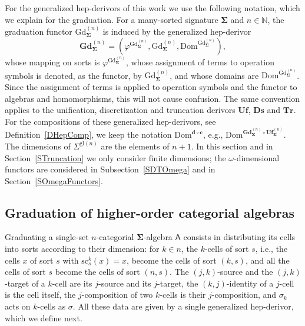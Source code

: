 \documentclass[a4paper, reqno
]{amsart}
\newcommand{\sig}[1]{\mathbf{#1}}             %
\newcommand{\calg}[1]{\boldsymbol{\mathsf{#1}}} %
\newcommand{\Dom}{\mathrm{Dom}}
\newcommand{\gl}{\mathrm{gl}}                %
\newcommand{\src}{\mathrm{sc}}
\newcommand{\Gd}{\mathrm{Gd}}
\newcommand{\bGd}{\mathbf{Gd}}
\newcommand{\bUf}{\mathbf{Uf}}
\newcommand{\bDs}{\mathbf{Ds}}
\newcommand{\bTr}{\mathbf{Tr}}
\theoremstyle{plain}
\theoremstyle{definition}
\begin{document}
For the generalized hep-derivors of this work we use the following notation, which we explain for the graduation.
For a many-sorted signature $\sig{\Sigma}$ and $n\in\mathbb{N}$, the graduation functor $\Gd^{(n)}_{\sig{\Sigma}}$ is induced by the generalized hep-derivor
$$
\bGd^{(n)}_{\sig{\Sigma}}=\left(\varphi^{\Gd^{(n)}_{\sig{\Sigma}}},\Gd^{(n)}_{\sig{\Sigma}},\Dom^{\Gd^{(n)}_{\sig{\Sigma}}}\right),
$$
whose mapping on sorts is $\varphi^{\Gd^{(n)}_{\sig{\Sigma}}}$, whose assignment of terms to operation symbols is denoted, as the functor, by $\Gd^{(n)}_{\sig{\Sigma}}$, and whose domains are $\Dom^{\Gd^{(n)}_{\sig{\Sigma}}}$.
Since the assignment of terms is applied to operation symbols and the functor to algebras and homomorphisms, this will not cause confusion.
The same convention applies to the unification, discretization and truncation derivors $\bUf$, $\bDs$ and $\bTr$.
For the compositions of these generalized hep-derivors, see Definition~\ref{DHepComp}, we keep the notation $\Dom^{\mathbf{d}\circ\mathbf{c}}$, e.g., $\Dom^{\bGd^{(n)}_{\sig{\Sigma}}\circ\bUf^{(n)}_{\sig{\Sigma}}}$.
The dimensions of $\Sigma^{\gl(n)}$ are the elements of $n+1$.
In this section and in Section~\ref{STruncation} we only consider finite dimensions; the $\omega$-dimensional functors are considered in Subsection~\ref{SDTOmega} and in Section~\ref{SOmegaFunctors}.

\subsection{Graduation of higher-order categorial algebras}\label{SGraduationSub}

Graduating a single-set $n$-categorial $\sig{\Sigma}$-algebra $\calg{A}$ consists in distributing its cells into sorts according to their dimension: for $k\in n$, the $k$-cells of sort $s$, i.e., the cells $x$ of sort $s$ with $\src^{k}_{s}(x)=x$, become the cells of sort $(k,s)$, and all the cells of sort $s$ become the cells of sort $(n,s)$.
The $(j,k)$-source and the $(j,k)$-target of a $k$-cell are its $j$-source and its $j$-target, the $(k,j)$-identity of a $j$-cell is the cell itself, the $j$-composition of two $k$-cells is their $j$-composition, and $\sigma_{k}$ acts on $k$-cells as $\sigma$.
All these data are given by a single generalized hep-derivor, which we define next.
\end{document}
